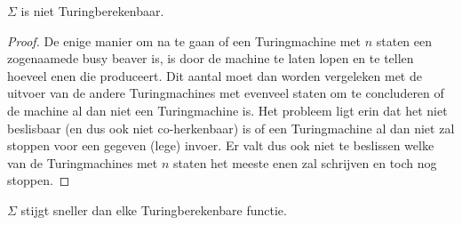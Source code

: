 \documentclass[main.tex]{subfiles}
\begin{document}
\begin{st}
  $\Sigma$ is niet Turingberekenbaar.

  \begin{proof}
    De enige manier om na te gaan of een Turingmachine met $n$ staten een zogenaamede busy beaver is, is door de machine te laten lopen en te tellen hoeveel enen die produceert.
    \waarom
    Dit aantal moet dan worden vergeleken met de uitvoer van de andere Turingmachines met evenveel staten om te concluderen of de machine al dan niet een Turingmachine is.
    Het probleem ligt erin dat het niet beslisbaar (en dus ook niet co-herkenbaar) is of een Turingmachine al dan niet zal stoppen voor een gegeven (lege) invoer.
    Er valt dus ook niet te beslissen welke van de Turingmachines met $n$ staten het meeste enen zal schrijven en toch nog stoppen.
  \end{proof}
\end{st}

\begin{st}
  $\Sigma$ stijgt sneller dan elke Turingberekenbare functie. \zb
\end{st}
\end{document}

